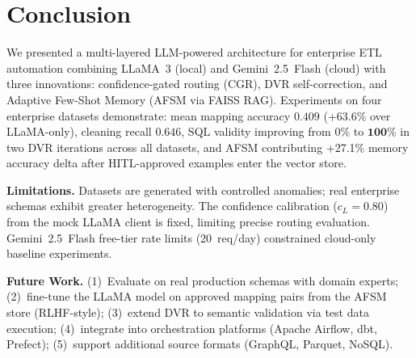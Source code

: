 \documentclass[conference]{IEEEtran}
\begin{document}
\section{Conclusion}
\label{sec:conclusion}

We presented a multi-layered LLM-powered architecture for enterprise ETL
automation combining LLaMA~3 (local) and Gemini~2.5~Flash (cloud) with
three innovations: confidence-gated routing (CGR), DVR self-correction,
and Adaptive Few-Shot Memory (AFSM via FAISS RAG). Experiments on four
enterprise datasets demonstrate: mean mapping accuracy $\mathbf{0.409}$
(+63.6\% over LLaMA-only), cleaning recall $0.646$, SQL validity
improving from $0\%$ to $\mathbf{100\%}$ in two DVR iterations across
all datasets, and AFSM contributing +27.1\% memory accuracy delta
after HITL-approved examples enter the vector store.

\textbf{Limitations.} Datasets are generated with controlled anomalies;
real enterprise schemas exhibit greater heterogeneity. The confidence
calibration ($c_L=0.80$) from the mock LLaMA client is fixed, limiting
precise routing evaluation. Gemini~2.5~Flash free-tier rate limits
(20~req/day) constrained cloud-only baseline experiments.

\textbf{Future Work.} (1)~Evaluate on real production schemas with domain
experts; (2)~fine-tune the LLaMA model on approved mapping pairs from the
AFSM store (RLHF-style); (3)~extend DVR to semantic validation via test
data execution; (4)~integrate into orchestration platforms
(Apache Airflow, dbt, Prefect); (5)~support additional source formats
(GraphQL, Parquet, NoSQL).


\end{document}
